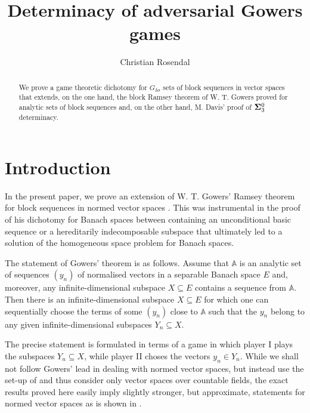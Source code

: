 \documentclass[10pt]{amsart}
\title{Determinacy of adversarial Gowers games}
\author {Christian Rosendal}
\newcommand {\A}{\mathbb A}
\theoremstyle{definition}
\begin{document}


\maketitle
\begin{abstract}
We prove a game theoretic dichotomy for $G_{\delta\sigma}$ sets of block sequences in vector spaces that extends, on the one hand, the block Ramsey theorem of W. T. Gowers proved for analytic sets of block sequences and, on the other hand, M. Davis' proof of ${\bf \Sigma}^0_3$ determinacy.
\end{abstract}

\section{Introduction}
In the present paper, we  prove an extension of W. T. Gowers' Ramsey theorem for block sequences in normed vector spaces \cite{gowers}. This was instrumental in the proof of his dichotomy for Banach spaces between containing an unconditional basic sequence or a hereditarily indecomposable subspace that ultimately led to a solution of the homogeneous space problem for Banach spaces.

The statement of Gowers' theorem is as follows. Assume that $\A$ is an analytic set of sequences $(y_n)$  of normalised vectors in a separable Banach space $E$ and, moreover,  any infinite-dimensional subspace $X\subseteq E$ contains a sequence from $\A$. Then there is an infinite-dimensional subspace $X\subseteq E$ for which one can sequentially choose the terms of some $(y_n)$ close to $\A$ such that the $y_n$ belong to any given infinite-dimensional subspaces $Y_n\subseteq X$. 

The precise statement is formulated in terms of a game in which player I plays the subspaces $Y_n\subseteq X$, while player II choses the vectors $y_n\in Y_n$. While we shall not follow Gowers' lead in dealing with normed vector spaces, but instead use the set-up of \cite{exact} and thus consider only vector spaces over countable fields, the exact results proved here easily imply slightly stronger, but approximate, statements for normed vector spaces as is shown in \cite{exact}. 
\end{document}
